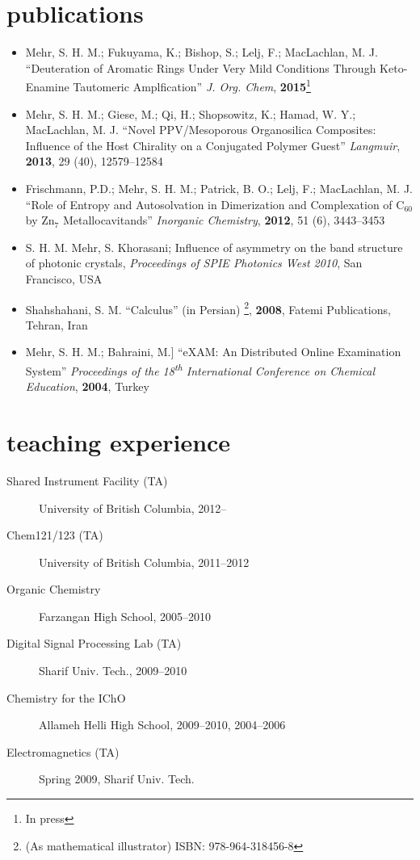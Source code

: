 \documentclass[overlapped,line,10pt,letterpaper]{res}
\begin{document}
\begin{resume}
\section{publications}
\begin{itemize}
\renewcommand{\labelitemi}{$\bullet$}
\item Mehr, S. H. M.; Fukuyama, K.; Bishop, S.; Lelj, F.; MacLachlan, M. J. ``Deuteration of Aromatic Rings Under Very Mild Conditions Through Keto-Enamine  Tautomeric Amplfication'' \emph{J. Org. Chem}, \textbf{2015}\footnote{In press}
\item  Mehr, S. H. M.; Giese, M.; Qi, H.; Shopsowitz, K.; Hamad, W. Y.; MacLachlan, M. J. ``Novel PPV/Mesoporous Organosilica Composites: Influence of the Host Chirality on a Conjugated Polymer Guest'' \emph{Langmuir}, \textbf{2013}, 29 (40), 12579–12584
\item Frischmann, P.D.; Mehr, S. H. M.; Patrick, B. O.; Lelj, F.; MacLachlan, M. J. ``Role of Entropy and Autosolvation in Dimerization and Complexation of $\mathrm{C_{60}}$ by $\mathrm{Zn_7}$ Metallocavitands'' \emph{Inorganic Chemistry}, \textbf{2012}, 51 (6), 3443–3453
\item S. H. M. Mehr, S. Khorasani; Influence of asymmetry on the band structure of photonic crystals, \emph{Proceedings of SPIE Photonics West 2010}, San Francisco, USA
\item Shahshahani, S. M. ``Calculus'' (in Persian) \footnote{ (As mathematical illustrator) ISBN: 978-964-318456-8}, \textbf{2008}, Fatemi Publications, Tehran, Iran
\item Mehr, S. H. M.; Bahraini, M.] ``eXAM: An Distributed Online Examination System'' \emph{Proceedings of the 18\textsuperscript{th} International Conference on Chemical Education}, \textbf{2004}, Turkey
\end{itemize}




\section{teaching experience}
\begin{description}
\item[Shared Instrument Facility (TA)] University of British Columbia, 2012–
\item[Chem121/123 (TA)] University of British Columbia, 2011–2012
\item[Organic Chemistry] Farzangan High School, 2005–2010
\item[Digital Signal Processing Lab (TA)] Sharif Univ. Tech., 2009–2010
\item[Chemistry for the IChO] Allameh Helli High School, 2009–2010, 2004–2006
\item[Electromagnetics (TA)] Spring 2009, Sharif Univ. Tech.
\end{description}


\end{resume}
\end{document}
